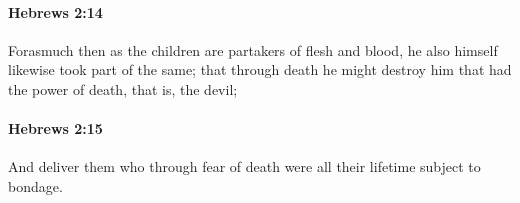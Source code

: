 		\paragraph{Hebrews 2:14} %
			\label{HEBREWS-2-14}

			Forasmuch then as the children are partakers of flesh and blood, he also himself likewise took part of the same; that through death he might destroy him that had the power of death, that is, the devil;

			\begin{framed}
			\scriptsize
				\begin{compactdesc}
					\item[SBLG] 
				\end{compactdesc}
			\end{framed}

		\paragraph{Hebrews 2:15} %
			\label{HEBREWS-2-15}

			And deliver them who through fear of death were all their lifetime subject to bondage.

